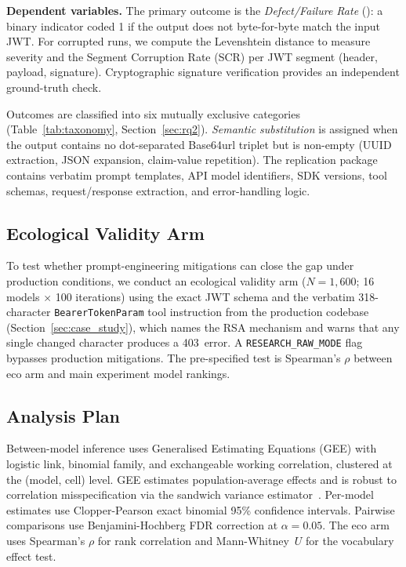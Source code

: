 \textbf{Dependent variables.}
The primary outcome is the \emph{Defect/Failure Rate} (\DFR{}): a binary
indicator coded 1 if the output does not byte-for-byte match the input JWT. For
corrupted runs, we compute the Levenshtein distance to measure severity and the
Segment Corruption Rate (SCR) per JWT segment (header, payload, signature).
Cryptographic signature verification provides an independent ground-truth check.

Outcomes are classified into six mutually exclusive categories
(Table~\ref{tab:taxonomy}, Section~\ref{sec:rq2}). \textit{Semantic
substitution} is assigned when the output contains no dot-separated
Base64url triplet but is non-empty (UUID extraction, JSON expansion,
claim-value repetition). The replication package contains verbatim
prompt templates, API model identifiers, SDK versions, tool schemas, request/response extraction, and error-handling
logic.

\subsection{Ecological Validity Arm}\label{sec:eco_arm}

To test whether prompt-engineering mitigations can close the gap under
production conditions, we conduct an ecological validity arm ($N\!=\!1{,}600$;
16 models $\times$ 100 iterations) using the exact JWT schema and the
verbatim 318-character \texttt{BearerTokenParam} tool instruction from the
production codebase (Section~\ref{sec:case_study}), which names the RSA
mechanism and warns that any single changed character produces a 403~error.
A \texttt{RESEARCH\_RAW\_MODE} flag bypasses production mitigations.
The pre-specified test is Spearman's $\rho$ between eco arm and main
experiment model rankings.

\subsection{Analysis Plan}\label{sec:analysis_plan}

Between-model inference uses Generalised Estimating Equations (GEE) with
logistic link, binomial family, and exchangeable working correlation, clustered
at the (model, cell) level. GEE estimates population-average effects and is
robust to correlation misspecification via the sandwich variance
estimator~\cite{kitchenham2001guidelines}. Per-model \DFR{} estimates use
Clopper-Pearson exact binomial 95\% confidence intervals. Pairwise comparisons
use Benjamini-Hochberg FDR correction at $\alpha\!=\!0.05$. The eco arm uses
Spearman's $\rho$ for rank correlation and Mann-Whitney~$U$ for the vocabulary
effect test.
